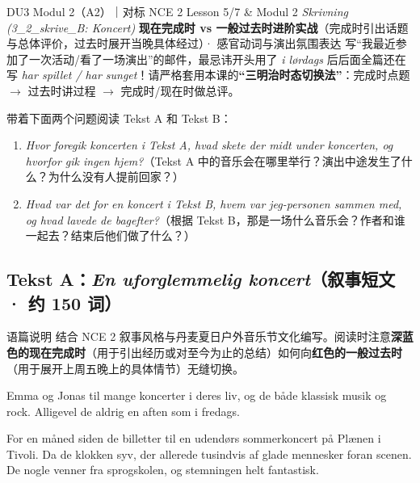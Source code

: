 {DU3 Modul 2（A2）｜对标 NCE 2 Lesson 5/7 \& Modul 2 \textit{Skrivning (3\_2\_skrive\_B: Koncert)}}
{\textbf{现在完成时 vs 一般过去时进阶实战}（完成时引出话题与总体评价，过去时展开当晚具体经过）· 感官动词与演出氛围表达}
{写“我最近参加了一次活动/看了一场演出”的邮件，最忌讳开头用了 \textit{i lørdags} 后后面全篇还在写 \textit{har spillet / har sunget}！请严格套用本课的\textbf{“三明治时态切换法”}：完成时点题 $\rightarrow$ 过去时讲过程 $\rightarrow$ 完成时/现在时做总评。}

\begin{foerduleaeser}
带着下面两个问题阅读 Tekst A 和 Tekst B：
\begin{enumerate}
  \item \textit{Hvor foregik koncerten i Tekst A, hvad skete der midt under koncerten, og hvorfor gik ingen hjem?}（Tekst A 中的音乐会在哪里举行？演出中途发生了什么？为什么没有人提前回家？）
  \item \textit{Hvad var det for en koncert i Tekst B, hvem var jeg-personen sammen med, og hvad lavede de bagefter?}（根据 Tekst B，那是一场什么音乐会？作者和谁一起去？结束后他们做了什么？）
\end{enumerate}
\end{foerduleaeser}


\subsection*{Tekst A：\textit{En uforglemmelig koncert}（叙事短文 · 约 150 词）}

\begin{tipbox}{语篇说明}
结合 NCE 2 叙事风格与丹麦夏日户外音乐节文化编写。阅读时注意\textbf{\color{NCDNavy}深蓝色的现在完成时}（用于引出经历或对至今为止的总结）如何向\textbf{\color{NCDRed}红色的一般过去时}（用于展开上周五晚上的具体情节）无缝切换。
\end{tipbox}

Emma og Jonas  til mange koncerter i deres liv, og de  både klassisk musik og rock. Alligevel  de aldrig  en aften som i fredags.

For en måned siden  de billetter til en udendørs sommerkoncert på Plænen i Tivoli. Da de  klokken syv,  der allerede tusindvis af glade mennesker foran scenen. De  nogle venner fra sprogskolen, og stemningen  helt fantastisk.

